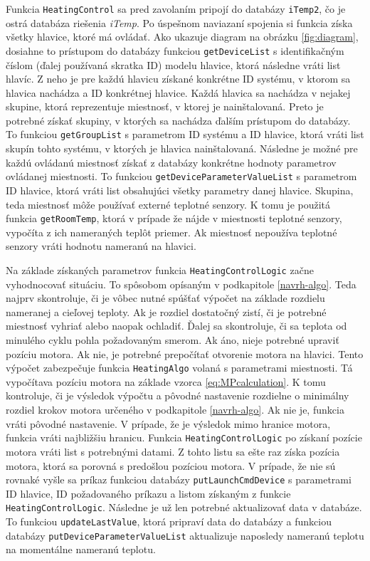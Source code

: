 Funkcia \texttt{HeatingControl} sa pred zavolaním pripojí do databázy \texttt{iTemp2}, čo je ostrá databáza riešenia \emph{iTemp}. 
Po úspešnom naviazaní spojenia si funkcia získa všetky hlavice, ktoré má ovládať.
Ako ukazuje diagram na obrázku \ref{fig:diagram}, dosiahne to prístupom do databázy funkciou \texttt{getDeviceList} s identifikačným číslom (ďalej používaná skratka ID) modelu hlavice, ktorá následne vráti list hlavíc.  
Z neho je pre každú hlavicu získané konkrétne ID systému, v ktorom sa hlavica nachádza a ID konkrétnej hlavice.
Každá hlavica sa nachádza v nejakej skupine, ktorá reprezentuje miestnosť, v ktorej je nainštalovaná. Preto je potrebné získať skupiny, v ktorých sa nachádza ďalším prístupom do databázy. 
To funkciou \texttt{getGroupList} s parametrom ID systému a ID hlavice, ktorá vráti list skupín tohto systému, v ktorých je hlavica nainštalovaná. Následne je možné pre každú ovládanú miestnosť získať z databázy konkrétne hodnoty parametrov ovládanej miestnosti. 
To funkciou \texttt{getDeviceParameterValueList} s parametrom ID hlavice, ktorá vráti list obsahujúci všetky parametry danej hlavice. 
Skupina, teda miestnosť môže používať externé teplotné senzory. K tomu je použitá funkcia \texttt{getRoomTemp}, ktorá v prípade že nájde v miestnosti teplotné senzory, vypočíta z ich nameraných teplôt priemer. 
Ak miestnosť nepoužíva teplotné senzory vráti hodnotu nameranú na hlavici.

Na základe získaných parametrov funkcia \texttt{HeatingControlLogic} začne vyhodnocovať situáciu. To spôsobom opísaným v podkapitole \ref{navrh-algo}. Teda najprv skontroluje, či je vôbec nutné spúšťať výpočet na základe rozdielu nameranej a cieľovej teploty. 
Ak je rozdiel dostatočný zistí, či je potrebné miestnosť vyhriať alebo  
naopak ochladiť. 
Ďalej sa skontroluje, či sa teplota od minulého cyklu pohla požadovaným smerom. Ak áno, nieje potrebné upraviť pozíciu motora. Ak nie, je potrebné prepočítať otvorenie motora na hlavici. 
Tento výpočet zabezpečuje funkcia \texttt{HeatingAlgo} volaná s parametrami miestnosti. 
Tá vypočítava pozíciu motora na základe vzorca \ref{eq:MPcalculation}. 
K tomu kontroluje, či je výsledok výpočtu a pôvodné nastavenie rozdielne o minimálny rozdiel krokov motora určeného v podkapitole \ref{navrh-algo}. 
Ak nie je, funkcia vráti pôvodné nastavenie. 
V prípade, že je výsledok mimo hranice motora, funkcia vráti najbližšiu hranicu. 
Funkcia \texttt{HeatingControlLogic} po získaní pozície motora vráti list s potrebnými datami. 
Z tohto listu sa ešte raz získa pozícia motora, ktorá sa porovná s predošlou pozíciou motora. 
V prípade, že nie sú rovnaké vyšle sa príkaz funkciou databázy \texttt{putLaunchCmdDevice} s parametrami ID hlavice, ID požadovaného príkazu a listom získaným z funkcie \texttt{HeatingControlLogic}. Následne je už len potrebné aktualizovať data v databáze. To funkciou \texttt{updateLastValue}, ktorá pripraví data do databázy a funkciou databázy \texttt{putDeviceParameterValueList} aktualizuje naposledy nameranú teplotu na momentálne nameranú teplotu.

